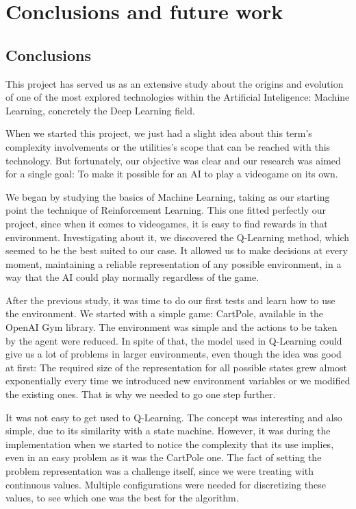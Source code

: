 \chapter{Conclusions and future work}
\label{cap:conclusions}


\section{Conclusions}

This project has served us as an extensive study about the origins and evolution of one of the most explored technologies within the Artificial Inteligence: Machine Learning, concretely the Deep Learning field.

When we started this project, we just had a slight idea about this term's complexity involvements or the utilities's scope that can be reached with this technology. But fortunately, our objective was clear and our research was aimed for a single goal: To make it possible for an AI to play a videogame on its own.

We began by studying the basics of Machine Learning, taking as our starting point the technique of Reinforcement Learning. This one fitted perfectly our project, since when it comes to videogames, it is easy to find rewards in that environment. Investigating about it, we discovered the Q-Learning method, which seemed to be the best suited to our case. It allowed us to make decisions at every moment, maintaining a reliable representation of any possible environment, in a way that the AI could play normally regardless of the game.

After the previous study, it was time to do our first tests and learn how to use the environment. We started with a simple game: CartPole, available in the OpenAI Gym library. The environment was simple and the actions to be taken by the agent were reduced. In spite of that, the model used in Q-Learning could give us a lot of problems in larger environments, even though the idea was good at first: The required size of the representation for all possible states grew almost exponentially every time we introduced new environment variables or we modified the existing ones. That is why we needed to go one step further. 

It was not easy to get used to Q-Learning. The concept was interesting and also simple, due to its similarity with a state machine. However, it was during the implementation when we started to notice the complexity that its use implies, even in an easy problem as it was the CartPole one. The fact of setting the problem representation was a challenge itself, since we were treating with continuous values. Multiple configurations were needed for discretizing these values, to see which one was the best for the algorithm.

